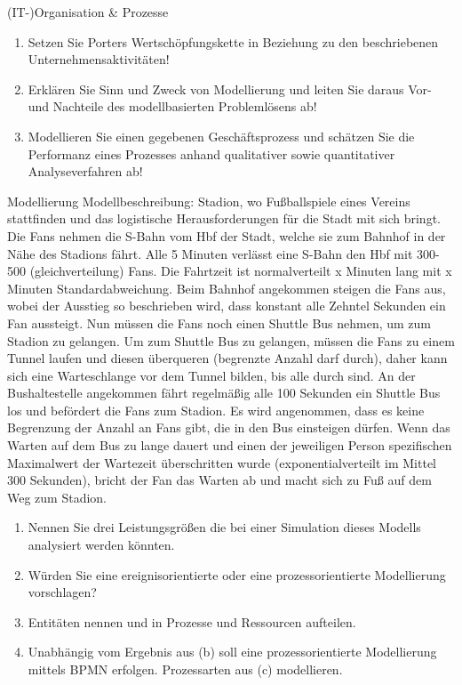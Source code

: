 \documentclass{article}
\begin{document}
\begin{exercise}{(IT-)Organisation \& Prozesse}
  \begin{enumerate}
    \item Setzen Sie Porters Wertschöpfungskette in Beziehung zu den beschriebenen Unternehmensaktivitäten!
    \item Erklären Sie Sinn und Zweck von Modellierung und leiten Sie daraus Vor- und Nachteile des modellbasierten Problemlösens ab!
    \item Modellieren Sie einen gegebenen Geschäftsprozess und schätzen Sie die Performanz eines Prozesses anhand qualitativer sowie quantitativer Analyseverfahren ab!
  \end{enumerate}
\end{exercise}

\begin{exercise}{Modellierung}
  Modellbeschreibung: Stadion, wo Fußballspiele eines Vereins stattfinden und das logistische Herausforderungen für die Stadt mit sich bringt. Die Fans nehmen die S-Bahn vom Hbf der Stadt, welche sie zum Bahnhof in der Nähe des Stadions fährt. Alle 5 Minuten verlässt eine S-Bahn den Hbf mit 300-500 (gleichverteilung) Fans. Die Fahrtzeit ist normalverteilt x Minuten lang mit x Minuten Standardabweichung. Beim Bahnhof angekommen steigen die Fans aus, wobei der Ausstieg so beschrieben wird, dass konstant alle Zehntel Sekunden ein Fan aussteigt. Nun müssen die Fans noch einen Shuttle Bus nehmen, um zum Stadion zu gelangen. Um zum Shuttle Bus zu gelangen, müssen die Fans zu einem Tunnel laufen und diesen überqueren (begrenzte Anzahl darf durch), daher kann sich eine Warteschlange vor dem Tunnel bilden, bis alle durch sind. An der Bushaltestelle angekommen fährt regelmäßig alle 100 Sekunden ein Shuttle Bus los und befördert die Fans zum Stadion. Es wird angenommen, dass es keine Begrenzung der Anzahl an Fans gibt, die in den Bus einsteigen dürfen. Wenn das Warten auf dem Bus zu lange dauert und einen der jeweiligen Person spezifischen Maximalwert der Wartezeit überschritten wurde (exponentialverteilt im Mittel 300 Sekunden), bricht der Fan das Warten ab und macht sich zu Fuß auf dem Weg zum Stadion.
  \begin{enumerate}
    \item Nennen Sie drei Leistungsgrößen die bei einer Simulation dieses Modells analysiert werden könnten.
    \item Würden Sie eine ereignisorientierte oder eine prozessorientierte Modellierung vorschlagen?
    \item Entitäten nennen und in Prozesse und Ressourcen aufteilen.
    \item Unabhängig vom Ergebnis aus (b) soll eine prozessorientierte Modellierung mittels BPMN erfolgen. Prozessarten aus (c) modellieren.
  \end{enumerate}
\end{exercise}
\end{document}
